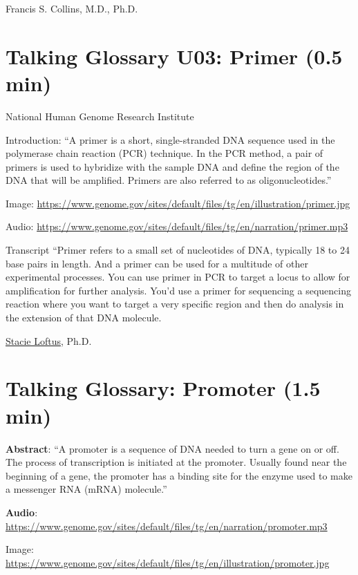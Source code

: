 \documentclass[
]{book}
\begin{document}
Francis S. Collins, M.D., Ph.D.

\hypertarget{talking-glossary-u03-primer-0.5-min}{%
\section{Talking Glossary U03: Primer (0.5 min)}\label{talking-glossary-u03-primer-0.5-min}}

National Human Genome Research Institute

Introduction: ``A primer is a short, single-stranded DNA sequence used in the polymerase chain reaction (PCR) technique. In the PCR method, a pair of primers is used to hybridize with the sample DNA and define the region of the DNA that will be amplified. Primers are also referred to as oligonucleotides.''

Image: \url{https://www.genome.gov/sites/default/files/tg/en/illustration/primer.jpg}

Audio: \url{https://www.genome.gov/sites/default/files/tg/en/narration/primer.mp3}

Transcript
``Primer refers to a small set of nucleotides of DNA, typically 18 to 24 base pairs in length. And a primer can be used for a multitude of other experimental processes. You can use primer in PCR to target a locus to allow for amplification for further analysis. You'd use a primer for sequencing a sequencing reaction where you want to target a very specific region and then do analysis in the extension of that DNA molecule.

\href{https://www.genome.gov/staff/Stacie-Loftus-PhD}{Stacie Loftus}, Ph.D.

\hypertarget{talking-glossary-promoter-1.5-min}{%
\section{Talking Glossary: Promoter (1.5 min)}\label{talking-glossary-promoter-1.5-min}}

\textbf{Abstract}: ``A promoter is a sequence of DNA needed to turn a gene on or off. The process of transcription is initiated at the promoter. Usually found near the beginning of a gene, the promoter has a binding site for the enzyme used to make a messenger RNA (mRNA) molecule.''

\textbf{Audio}: \url{https://www.genome.gov/sites/default/files/tg/en/narration/promoter.mp3}

Image: \url{https://www.genome.gov/sites/default/files/tg/en/illustration/promoter.jpg}
\end{document}
